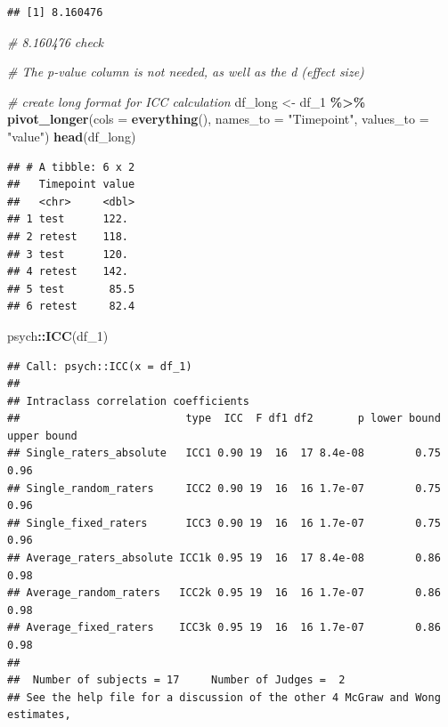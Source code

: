 \documentclass[
]{book}
\newenvironment{Shaded}{\begin{snugshade}}{\end{snugshade}}
\newcommand{\AttributeTok}[1]{\textcolor[rgb]{0.13,0.29,0.53}{#1}}
\newcommand{\CommentTok}[1]{\textcolor[rgb]{0.56,0.35,0.01}{\textit{#1}}}
\newcommand{\ConstantTok}[1]{\textcolor[rgb]{0.56,0.35,0.01}{#1}}
\newcommand{\FunctionTok}[1]{\textcolor[rgb]{0.13,0.29,0.53}{\textbf{#1}}}
\newcommand{\NormalTok}[1]{#1}
\newcommand{\OtherTok}[1]{\textcolor[rgb]{0.56,0.35,0.01}{#1}}
\newcommand{\SpecialCharTok}[1]{\textcolor[rgb]{0.81,0.36,0.00}{\textbf{#1}}}
\newcommand{\StringTok}[1]{\textcolor[rgb]{0.31,0.60,0.02}{#1}}
\begin{document}
\begin{Shaded}
\end{Shaded}

\begin{verbatim}
## [1] 8.160476
\end{verbatim}

\begin{Shaded}
\begin{Highlighting}[]
\CommentTok{\# 8.160476 check}

\CommentTok{\# The p{-}value column is not needed, as well as the d (effect size)}

\CommentTok{\# create long format for ICC calculation}
\NormalTok{df\_long }\OtherTok{\textless{}{-}}\NormalTok{ df\_1 }\SpecialCharTok{\%\textgreater{}\%}
  \FunctionTok{pivot\_longer}\NormalTok{(}\AttributeTok{cols =} \FunctionTok{everything}\NormalTok{(), }\AttributeTok{names\_to =} \StringTok{"Timepoint"}\NormalTok{, }\AttributeTok{values\_to =} \StringTok{"value"}\NormalTok{) }
\FunctionTok{head}\NormalTok{(df\_long)}
\end{Highlighting}
\end{Shaded}

\begin{verbatim}
## # A tibble: 6 x 2
##   Timepoint value
##   <chr>     <dbl>
## 1 test      122. 
## 2 retest    118. 
## 3 test      120. 
## 4 retest    142. 
## 5 test       85.5
## 6 retest     82.4
\end{verbatim}

\begin{Shaded}
\begin{Highlighting}[]
\NormalTok{psych}\SpecialCharTok{::}\FunctionTok{ICC}\NormalTok{(df\_1)}
\end{Highlighting}
\end{Shaded}

\begin{verbatim}
## Call: psych::ICC(x = df_1)
## 
## Intraclass correlation coefficients 
##                          type  ICC  F df1 df2       p lower bound upper bound
## Single_raters_absolute   ICC1 0.90 19  16  17 8.4e-08        0.75        0.96
## Single_random_raters     ICC2 0.90 19  16  16 1.7e-07        0.75        0.96
## Single_fixed_raters      ICC3 0.90 19  16  16 1.7e-07        0.75        0.96
## Average_raters_absolute ICC1k 0.95 19  16  17 8.4e-08        0.86        0.98
## Average_random_raters   ICC2k 0.95 19  16  16 1.7e-07        0.86        0.98
## Average_fixed_raters    ICC3k 0.95 19  16  16 1.7e-07        0.86        0.98
## 
##  Number of subjects = 17     Number of Judges =  2
## See the help file for a discussion of the other 4 McGraw and Wong estimates,
\end{verbatim}
\end{document}
